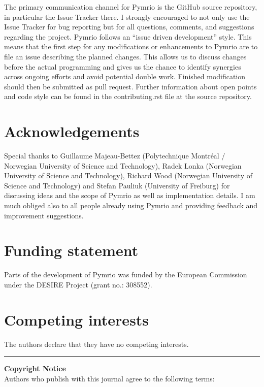 \documentclass{jors}
\begin{document}
The primary communication channel for Pymrio is the GitHub source repository, in particular the Issue Tracker there. 
I strongly encouraged to not only use the Issue Tracker for bug reporting but for all questions, comments, and suggestions regarding the project.
Pymrio follows an ``issue driven development'' style. This means that the first step for any modifications or enhancements to Pymrio are to file an issue describing the planned changes.
This allows us to discuss changes before the actual programming and gives us the chance to identify synergies across ongoing efforts and avoid potential double work. 
Finished modification should then be submitted as pull request. Further information about open points and code style can be found in the contributing.rst file at the source repository.

\section*{Acknowledgements}
Special thanks to 
Guillaume Majeau-Bettez (Polytechnique Montréal / Norwegian University of Science and Technology), 
Radek Lonka (Norwegian University of Science and Technology),
Richard Wood (Norwegian University of Science and Technology) and
Stefan Pauliuk (University of Freiburg) 
for discussing ideas and the scope of Pymrio as well as implementation details.
I am much obliged also to all people already using Pymrio and providing feedback and improvement suggestions. 


\section*{Funding statement}

Parts of the development of Pymrio was funded by the European Commission under the DESIRE Project (grant no.: 308552).

\section*{Competing interests}

The authors declare that they have no competing interests.




  

\vspace{2cm}

\rule{\textwidth}{1pt}

{ \bf Copyright Notice} \\
Authors who publish with this journal agree to the following terms: \\
\end{document}
